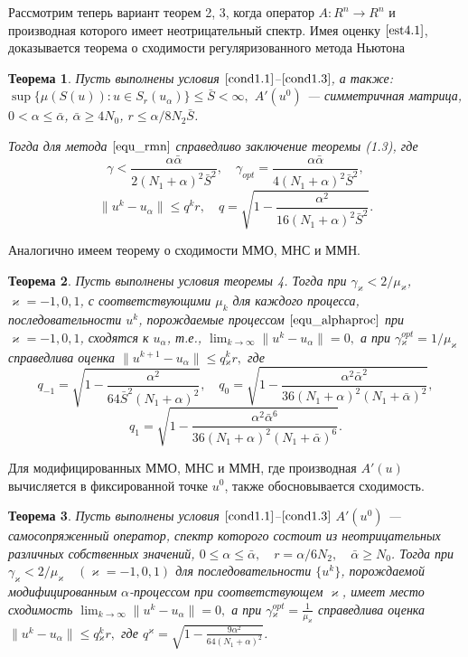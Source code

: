 \documentclass[%
autoref,     %
href,        %
facsimile,   %
colorlinks,  %
]{disser}
\newtheorem{theorem}{Теорема}
\begin{document}
Рассмотрим теперь вариант теорем 2, 3, когда оператор $A\colon R^n \to R^n$ и производная которого имеет неотрицательный спектр. Имея оценку $\eqref{est4.1}$, доказывается теорема о сходимости регуляризованного метода Ньютона
\begin{theorem}\label{conv_rate_nemonot_nwt}
	Пусть выполнены условия $\eqref{cond1.1}$--$\eqref{cond1.3}$, а также: $\sup\{\mu(S(u)): u\in S_r(u_\alpha)\}\leqslant\bar S <\infty,$ 
	$A'(u^0)$ --- симметричная матрица, $0<\alpha\leqslant\bar\alpha$, $\bar\alpha\geqslant 4N_0$, $r\leqslant\alpha/8N_2\bar S$.

	Тогда для метода $\eqref{equ_rmn}$ справедливо заключение теоремы (1.3), где
	$$\gamma<\frac{\alpha\bar\alpha}{2(N_1+\alpha)^2\bar S^2},
	\quad
	{\gamma}_{opt}=\frac{\alpha\bar\alpha}{4(N_1+\alpha)^2\bar S^2},$$ 
	$$\|u^k-u_\alpha\|\leqslant q^k r, \quad q=\sqrt{1-\frac{\alpha ^2}{16(N_1+\alpha)^2\bar S^2}}.$$
\end{theorem}
Аналогично имеем теорему о сходимости ММО, МНС и ММН.
\begin{theorem}\label{conv_rate_nemonot_alpha}
Пусть выполнены условия теоремы 4. 
Тогда при $\gamma_\varkappa<2/\mu _\varkappa$, $\varkappa=-1,0,1$, с соответствующими $\mu _k$ для каждого процесса, последовательности ${u^k}$, порождаемые процессом $\eqref{equ_alphaproc}$ при $\varkappa=-1,0,1$, сходятся к $u_\alpha$, т.е., $\lim_{k\to\infty}\|u^k-u_\alpha\|=0,$ а при $
\gamma{_\varkappa^{opt}}=1/\mu_\varkappa$
справедлива оценка $\|u^{k+1}-u_\alpha\|\leqslant q{_\varkappa^k}r,$ где
$$q_{-1}=\sqrt{1-\frac{\alpha^2}{64\bar S^2(N_1+\alpha)^2}}, \quad q_0=\sqrt{1-\frac{\alpha^2\bar\alpha^2}{36(N_1+\alpha)^2(N_1+\bar\alpha)^2}},$$
$$q_1=\sqrt{1-\frac{\alpha^2\bar\alpha^6}{36(N_1+\alpha)^2(N_1+\bar\alpha)^6}}.$$
\end{theorem}
Для модифицированных ММО, МНС и ММН, где производная $A'(u)$ вычисляется в фиксированной точке $u^0$, также обосновывается сходимость.	
\begin{theorem}\label{conv_rate_nemonot_alpha_mod}
	Пусть выполнены условия $\eqref{cond1.1}$--$\eqref{cond1.3}$ $A'(u^0)$ --- самосопряженный оператор, спектр которого состоит из неотрицательных различных собственных значений, 
	$0\leqslant\alpha\leqslant\bar{\alpha}, \quad r=\alpha/6N_2, \quad \bar{\alpha}\geqslant N_0$. Тогда при
	$\gamma _\varkappa <2/\mu _\varkappa \quad (\varkappa=-1,0,1)$
	для последовательности $\{u^k\}$, порождаемой модифицированным $\alpha$-процессом при соответствующем $\varkappa$, имеет место сходимость $\lim_{k\to\infty}\|u^k-u_\alpha\|=0, $ а при 
	$\gamma{_\varkappa^{opt}}=\frac{1}{\mu_\varkappa}$
	справедлива оценка $\|u^k-u_\alpha\|\leqslant q{_\varkappa^k}r,$ где
	$q^\varkappa=\sqrt{1-\frac{9\alpha^2}{64(N_1+\alpha)^2}}$.
\end{theorem}
\end{document}
